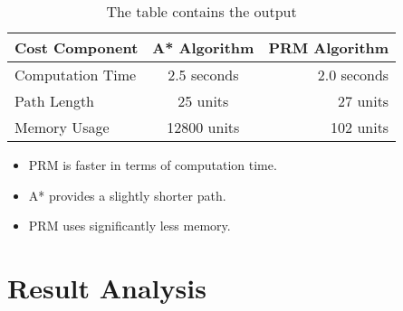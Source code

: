 \documentclass[9pt,a4paper,twoside]{rho-class/rho}
\begin{document}
    \begin{table}[h!]
    \centering
    \begin{tabular}{|l|c|r|}
        \hline
        Cost Component & A* Algorithm & PRM Algorithm \\
        \hline
        Computation Time & 2.5 seconds & 2.0 seconds \\
        Path Length & 25 units & 27 units \\
        Memory Usage & 12800 units & 102 units \\
        \hline
    \end{tabular}
    \caption{The table contains the output}
    \label{tab:example}
    \end{table}

                
            

        \begin{itemize}
            \item PRM is faster in terms of computation time.
            \item A* provides a slightly shorter path.
            \item PRM uses significantly less memory.
        \end{itemize}

\section{Result Analysis}
\end{document}
